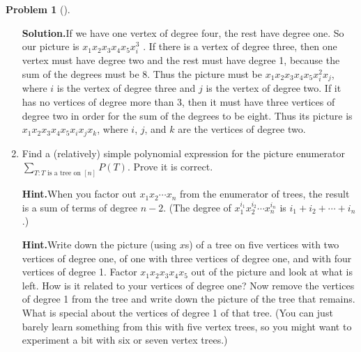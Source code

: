 \documentclass[10pt,]{book}
\theoremstyle{plain}
\theoremstyle{definition}
\newtheorem{activity}[project]{Problem}
\theoremstyle{definition}
\numberwithin{equation}{chapter}
\begin{document}
\begin{activity}[]
\begin{enumerate}[font=\bfseries,label=(\alph*),ref=\alph*]
\par\medskip\noindent%
\textbf{Solution.}\quad If we have one vertex of degree four, the rest have degree one. So our picture is \(x_1x_2x_3x_4x_5x_i^3\) . If there is a vertex of degree three, then one vertex must have degree two and the rest must have degree 1, because the sum of the degrees must be 8. Thus the picture must be \(x_1x_2x_3x_4x_5x_i^2 x_j\), where \(i\) is the vertex of degree three and \(j\) is the vertex of degree two. If it has no vertices of degree more than 3, then it must have three vertices of degree two in order for the sum of the degrees to be eight. Thus its picture is \(x_1x_2x_3x_4x_5x_ix_jx_k\), where \(i\), \(j\), and \(k\) are the vertices of degree two.%
\item\label{task-133} Find a (relatively) simple polynomial expression for the picture enumerator  \(\sum_{T \colon T\text{ is a tree on }[n]} P (T)\). Prove it is correct.%
\par\medskip\noindent%
\textbf{Hint.}\quad When you factor out \(x_1 x_2\cdots x_n\) from the enumerator of trees, the result is a sum of terms of degree \(n - 2\). (The degree of \(x_1^{i_1} x_2^{i_2} \cdots x_n^{i_n}\) is \(i_1 + i_2 + \cdots + i_n\).)%
\par\medskip\noindent%
\textbf{Hint.}\quad Write down the picture (using \(x\)s) of a tree on five vertices with two vertices of degree one, of one with three vertices of degree one, and with four vertices of degree 1. Factor \(x_1 x_2 x_3 x_4 x_5\) out of the picture and look at what is left.  How is it related to your vertices of degree one? Now remove the vertices of degree 1 from the tree and write down the picture of the tree that remains.  What is special about the vertices of degree 1 of that tree. (You can just barely learn something from this with five vertex trees, so you might want to experiment a bit with six or seven vertex trees.)%
\par\medskip\noindent%

\end{enumerate}
\end{activity}
\end{document}
